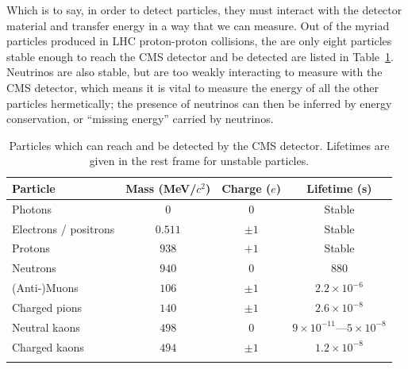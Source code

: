 Which is to say, in order to detect particles, they must interact with the detector material and transfer energy in a way that we can measure.
Out of the myriad particles produced in LHC proton-proton collisions, the are only eight particles stable enough to reach the CMS detector and be detected are listed in Table~\ref{tab:02_cms_particles}.
Neutrinos are also stable, but are too weakly interacting to measure with the CMS detector, which means it is vital to measure the energy of all the other particles hermetically; the presence of neutrinos can then be inferred by energy conservation, or ``missing energy'' carried by neutrinos.

\begin{table}[ht!]
    \centering
    \caption{Particles which can reach and be detected by the CMS detector. Lifetimes are given in the rest frame for unstable particles.}
    \label{tab:02_cms_particles}
    \begin{tabular}{@{}lccc@{}}
        \toprule
        \textbf{Particle} & \textbf{Mass (MeV/$c^2$)} & \textbf{Charge ($e$)} & \textbf{Lifetime (s)} \\
        \midrule
        Photons                      & $0$                    & $0$     & Stable \\
        Electrons / positrons         & $0.511$                & $\pm1$    & Stable \\
        Protons                      & $938$                  & $+1$    & Stable \\
        Neutrons                    & $940$                 & $0$     & $880$ \\
        (Anti-)Muons                       & $106$                  & $\pm1$    & $2.2 \times 10^{-6}$ \\
        Charged pions                & $140$                  & $\pm1$  & $2.6 \times 10^{-8}$ \\
        Neutral kaons               & $498$                 & $0$                     & $9 \times 10^{-11}$---$5 \times 10^{-8}$ \\
        Charged kaons                & $494$                  & $\pm1$  & $1.2 \times 10^{-8}$ \\
        \cbottomrule
    \end{tabular}
\end{table}

